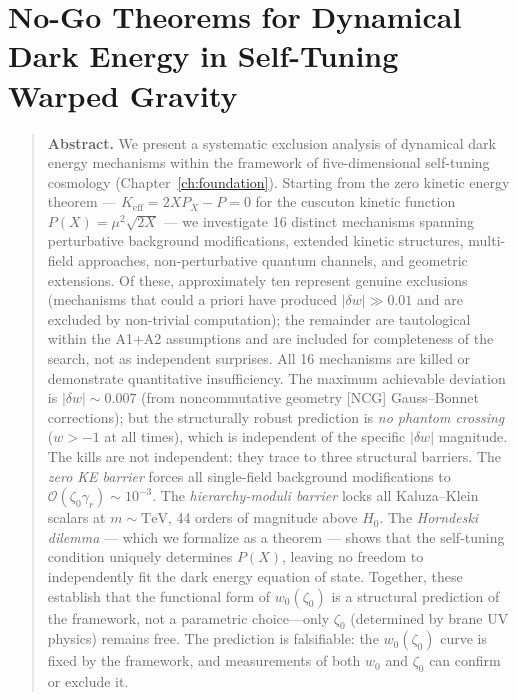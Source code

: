 
\chapter{No-Go Theorems for Dynamical Dark Energy in Self-Tuning Warped Gravity}
\label{ch:nogo}

\begin{quote}
\textbf{Abstract.}
We present a systematic exclusion analysis of dynamical dark energy mechanisms within the framework of five-dimensional self-tuning cosmology (Chapter~\ref{ch:foundation}). Starting from the zero kinetic energy theorem --- $K_{\mathrm{eff}} = 2XP_X - P = 0$ for the cuscuton kinetic function $P(X) = \mu^2\sqrt{2X}$ --- we investigate 16 distinct mechanisms spanning perturbative background modifications, extended kinetic structures, multi-field approaches, non-perturbative quantum channels, and geometric extensions. Of these, approximately ten represent genuine exclusions (mechanisms that could a priori have produced $|\delta w| \gg 0.01$ and are excluded by non-trivial computation); the remainder are tautological within the A1+A2 assumptions and are included for completeness of the search, not as independent surprises. All 16 mechanisms are killed or demonstrate quantitative insufficiency. The maximum achievable deviation is $|\delta w| \sim 0.007$ (from noncommutative geometry [NCG] Gauss--Bonnet corrections); but the structurally robust prediction is \emph{no phantom crossing} ($w > -1$ at all times), which is independent of the specific $|\delta w|$ magnitude. The kills are not independent: they trace to three structural barriers. The \emph{zero KE barrier} forces all single-field background modifications to $\mathcal{O}(\zeta_0 \gamma_r) \sim 10^{-3}$. The \emph{hierarchy-moduli barrier} locks all Kaluza--Klein scalars at $m \sim \mathrm{TeV}$, 44 orders of magnitude above $H_0$. The \emph{Horndeski dilemma} --- which we formalize as a theorem --- shows that the self-tuning condition uniquely determines $P(X)$, leaving no freedom to independently fit the dark energy equation of state. Together, these establish that the functional form of $w_0(\zeta_0)$ is a structural prediction of the framework, not a parametric choice---only $\zeta_0$ (determined by brane UV physics) remains free. The prediction is falsifiable: the $w_0(\zeta_0)$ curve is fixed by the framework, and measurements of both $w_0$ and $\zeta_0$ can confirm or exclude it.
\end{quote}

